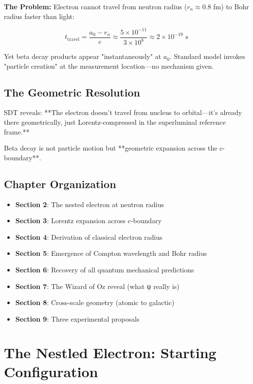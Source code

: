 \textbf{The Problem:} Electron cannot travel from neutron radius ($r_n \approx 0.8$ fm) to Bohr radius faster than light:

\begin{equation}
t_{\text{travel}} = \frac{a_0 - r_n}{c} \approx \frac{5 \times 10^{-11}}{3 \times 10^8} \approx 2 \times 10^{-19} \text{ s}
\end{equation}

Yet beta decay products appear "instantaneously" at $a_0$. Standard model invokes "particle creation" at the measurement location—no mechanism given.

\subsection{The Geometric Resolution}

SDT reveals: **The electron doesn't travel from nucleus to orbital—it's already there geometrically, just Lorentz-compressed in the superluminal reference frame.**

Beta decay is not particle motion but **geometric expansion across the c-boundary**.

\subsection{Chapter Organization}

\begin{itemize}
\item \textbf{Section 2}: The nested electron at neutron radius
\item \textbf{Section 3}: Lorentz expansion across c-boundary
\item \textbf{Section 4}: Derivation of classical electron radius
\item \textbf{Section 5}: Emergence of Compton wavelength and Bohr radius
\item \textbf{Section 6}: Recovery of all quantum mechanical predictions
\item \textbf{Section 7}: The Wizard of Oz reveal (what ψ really is)
\item \textbf{Section 8}: Cross-scale geometry (atomic to galactic)
\item \textbf{Section 9}: Three experimental proposals
\end{itemize}

\section{The Nestled Electron: Starting Configuration}

